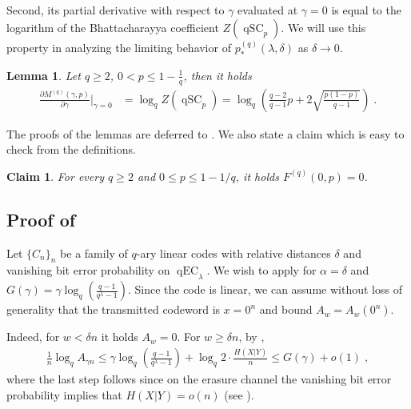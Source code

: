 \documentclass{article}
\DeclareMathOperator{\qSC}{qSC}
\DeclareMathOperator{\qEC}{qEC}
\theoremstyle{plain}
\theoremstyle{plain}
\theoremstyle{plain}
\theoremstyle{plain}
\theoremstyle{plain}
\theoremstyle{plain}
\newtheorem{claim}[definition]{Claim}%
\theoremstyle{plain}
\newtheorem{lemma}[definition]{Lemma}%
\theoremstyle{plain}
\theoremstyle{plain}
\theoremstyle{plain}
\theoremstyle{remark}
\theoremstyle{remark}
\theoremstyle{remark}
\theoremstyle{plain}
\begin{document}
Second, its partial derivative with respect
to $\gamma$ evaluated at $\gamma=0$
is equal to the logarithm of the Bhattacharayya coefficient
$Z(\qSC_p)$. We will use this property in analyzing
the limiting behavior of $p_*^{(q)}(\lambda,\delta)$ as $\delta\to 0$.

\begin{lemma}  
\label{lem:m-derivative-at-0}
Let $q\ge 2$, $0<p\le 1-\frac{1}{q}$, then it holds
\begin{align*}
     \frac{\partial  M^{(q)}(\gamma,p)}{\partial \gamma}\bigg\rvert_{\gamma=0}&=\log_q Z(\qSC_p)=\log_q\left(\frac{q-2}{q-1}p+2\sqrt{\frac{p(1-p)}{q-1}}\right)\;.
\end{align*}
\end{lemma}

The proofs of the lemmas are deferred to . We also state a claim
which is easy to check from the definitions.

\begin{claim}
\label{cl:f-is-zero-for-gamma-zero}
For every $q\ge 2$ and $0\le p\le 1-1/q$,
it holds $F^{(q)}(0,p)=0$.
\end{claim}

\subsection{Proof of }

Let $\{C_n\}_n$ be a family of $q$-ary linear
codes with relative distances $\delta$
and vanishing bit error probability
on $\qEC_\lambda$. We wish to apply
for $\alpha=\delta$ and
$G(\gamma)= \gamma\log_q\left(\frac{q-1}{q^{\lambda}-1}\right)$. Since the code
is linear, we can assume without loss of generality that the transmitted codeword is $x=0^n$ and bound 
$A_w=A_w(0^n)$.

Indeed, for $w<\delta n$ it holds
$A_w=0$. For $w\ge\delta n$, by
,
\begin{align*}
\frac{1}{n}\log_q A_{\gamma n}
\le \gamma \log_q\left(\frac{q-1}{q^{\lambda}-1}\right)+\log_q 2\cdot \frac{H(X|Y)}{n}\le
G(\gamma)+o(1)\;,
\end{align*}
where the last step follows since
on the erasure channel the
vanishing bit error probability
implies that $H(X|Y)=o(n)$
(see ).
\end{document}
